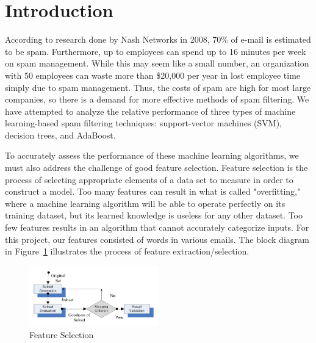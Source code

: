 \section{Introduction}
According to research done by Nash Networks \cite{choudhary} in 2008, 70\% of e-mail is estimated to be spam. Furthermore, up to employees can spend up to 16 minutes per week on spam management. While this may seem like a small number, an organization with 50 employees can waste more than \$20,000 per year in lost employee time simply due to spam management. Thus, the costs of spam are  high for most large companies, so there is a demand for more effective methods of spam filtering. We have attempted to analyze the relative performance of three types of machine learning-based spam filtering techniques: support-vector machines (SVM), decision trees, and AdaBoost.

To accurately assess the performance of these machine learning algorithms, we must also address the challenge of good feature selection. Feature selection is the process of selecting appropriate elements of a data set to measure in order to construct a model. Too many features can result in what is called "overfitting," where a machine learning algorithm will be able to operate perfectly on its training dataset, but its learned knowledge is useless for any other dataset. Too few features results in an algorithm that cannot accurately categorize inputs. For this project, our features consisted of words in various emails. The block diagram in Figure~\ref{fig:featureSelection} illustrates the process of feature extraction/selection. 



\begin{figure}[h]
    \centering
    \includegraphics[width=0.5\textwidth]{featureSelection}
    \caption{Feature Selection}
    \label{fig:featureSelection}
\end{figure}
